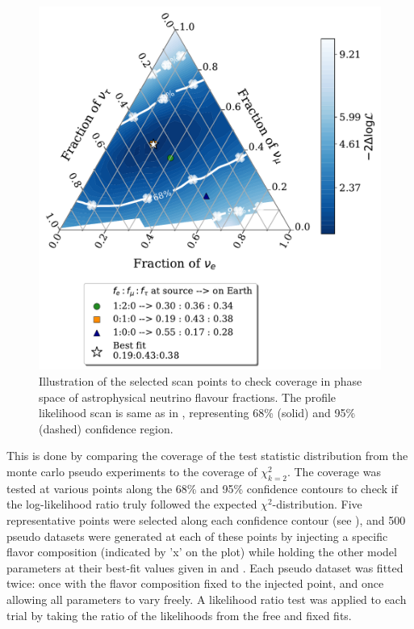 \begin{figure}[h!]
    
    \includegraphics{./figures/results/HESE12_fancy_coverage.pdf}


    \caption[Illustration of the selected scan points to check coverage in phase space of astrophysical neutrino flavour fractions]{Illustration of the selected scan points to check coverage in phase space of astrophysical neutrino flavour fractions. The profile likelihood scan is same as in , representing 68\% (solid) and 95\% (dashed) confidence region.}
\end{figure}

This is done by comparing the coverage of the test statistic distribution from the monte carlo pseudo experiments to the coverage of $\chi_{k=2}^2$. The coverage was tested at various points along the 68\% and 95\% confidence contours to check if the log-likelihood ratio truly followed the expected \(\chi^2\)-distribution. Five representative points were selected along each confidence contour (see ), and 500 pseudo datasets were generated at each of these points by injecting a specific flavor composition (indicated by 'x' on the plot) while holding the other model parameters at their best-fit values given in  and . Each pseudo dataset was fitted twice: once with the flavor composition fixed to the injected point, and once allowing all parameters to vary freely. A likelihood ratio test was applied to each trial by taking the ratio of the likelihoods from the free and fixed fits.

